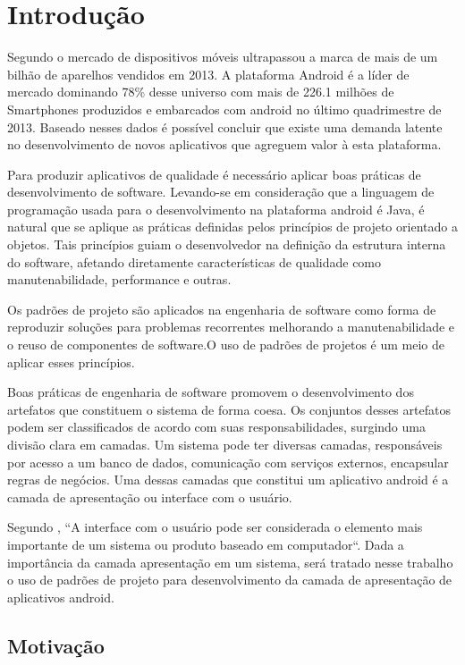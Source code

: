 \chapter{Introdução}

Segundo \cite{idc} o mercado de dispositivos móveis ultrapassou a marca de mais de um
bilhão de aparelhos vendidos em 2013. A plataforma Android é a líder
de mercado dominando 78\% desse universo com mais de 226.1 milhões de
Smartphones produzidos e embarcados com android no último quadrimestre de 2013.
Baseado nesses dados é possível concluir que existe uma demanda latente no
desenvolvimento de novos aplicativos que agreguem valor à esta plataforma.

Para produzir aplicativos de qualidade é necessário aplicar boas práticas de
desenvolvimento de software. Levando-se em consideração que a linguagem de
programação usada para o desenvolvimento na plataforma android é Java, é
natural que se aplique as práticas definidas pelos princípios de projeto
orientado a objetos. Tais  princípios guiam o desenvolvedor na definição da
estrutura interna do software, afetando diretamente características  de
qualidade como manutenabilidade, performance e outras\cite{tempero-di}.

Os padrões de projeto são aplicados na engenharia de software como forma de
reproduzir  soluções  para problemas recorrentes melhorando a manutenabilidade e
o reuso de componentes de software\cite{gof}.O uso de padrões de projetos
é um meio de aplicar esses princípios.

Boas práticas de engenharia de software promovem o desenvolvimento dos
artefatos que constituem o sistema de forma coesa. Os conjuntos desses artefatos
podem ser classificados de acordo com suas responsabilidades, surgindo
uma divisão clara em camadas. Um sistema pode ter diversas camadas, responsáveis
por acesso a um banco de dados, comunicação com serviços externos, encapsular
regras de negócios. Uma dessas camadas que constitui um aplicativo android é a
camada de apresentação ou interface com o usuário.
 
Segundo , ``A interface com o usuário pode ser considerada
o elemento mais importante de um sistema ou produto baseado em computador``.
Dada a importância da camada apresentação em um sistema, será tratado nesse
trabalho o uso de padrões de projeto para desenvolvimento da camada de
apresentação de aplicativos android.

\section{Motivação}


